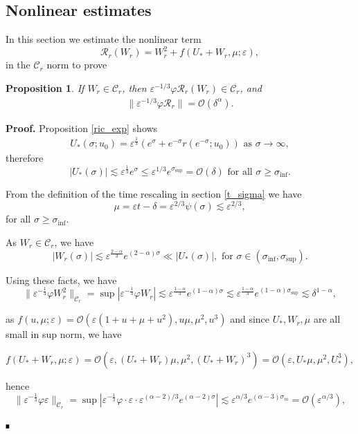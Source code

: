 \documentclass[letterpaper,11pt]{article}
\newcommand{\rmO}{\mathcal{O}}
\newcommand{\eps}{\varepsilon}
\newcommand{\lar}{ \lesssim }
\numberwithin{equation}{section}
\theoremstyle{plain}
\newtheorem{proposition}[theorem]{Proposition}
\newenvironment{Proof}[1][.]%
 {\begin{trivlist}\item[]\textbf{Proof#1 }}%
 {\hspace*{\fill}$\rule{0.3\baselineskip}{0.35\baselineskip}$\end{trivlist}}
\begin{document}
\subsection{Nonlinear estimates}

In this section we estimate the nonlinear term
\[
\mathcal{R}_r(W_r) = W_r^2 + f(U_*+W_r, \mu ; \eps),
\]
in the $\mathcal{C}_r$ norm to prove 
\begin{proposition}\label{nl_est_r}
If $W_r \in \mathcal{C}_{r}$, then $\eps^{-1/3}\varphi \mathcal{R}_r(W_r) \in \mathcal{C}_{r}$, and
\begin{align}
\|\eps^{-1/3}\varphi \mathcal{R}_r \| = \rmO(\delta^{\alpha}).
\end{align}
\end{proposition}
\begin{Proof} Proposition \ref{ric_exp} shows
\begin{align*}
U_*(\sigma;u_0) =  \eps^{\frac{1}{3}}(e^\sigma+e^{-\sigma} r(e^{-\sigma}; u_0)   ) \text{ as }\sigma \to \infty,
\end{align*}
therefore 
\[
|U_*(\sigma)| \lar \eps^{\frac{1}{3}}e^\sigma \le \eps^{1/3}e^{\sigma_{\sup}} = \rmO(\delta) \text{ for all } \sigma \ge \sigma_{\inf}.
\]

From the definition of the time rescaling in section \ref{t_sigma} we have
\[
\mu = \eps t-\delta  =\eps^{2/3}\psi(\sigma) \lar \eps^{2/3},
\]
for all $\sigma \ge \sigma_{\inf}$.

As $W_r \in \mathcal{C}_r$, we have 
\[
|W_r(\sigma)| \lar \eps^{\frac{2-\alpha}{3}} e^{(2-\alpha)\sigma} \ll |U_*(\sigma)|, \text{ for } \sigma \in (\sigma_{\inf}, \sigma_{\sup}).
\]

Using these facts, we have
\[
\|\eps^{-\frac{1}{3}}\varphi W_r^2\|_{\mathcal{C}_r}=\sup |\eps^{-\frac{1}{3}} \varphi W_r| \lar \eps^{\frac{1-\alpha}{3}} e^{(1-\alpha)\sigma} \lar \eps^{\frac{1-\alpha}{3}} e^{(1-\alpha)\sigma_{\sup}} \lar \delta^{1-\alpha},
\]

as $f(u,\mu; \eps) = \rmO(\eps(1+u+\mu+u^2),u\mu,\mu^2,u^3)$ and since $U_*,W_r,\mu$ are all small in sup norm, we have

\[
f(U_*+W_r, \mu ;\eps) = \rmO(\eps, (U_*+W_r)\mu, \mu^2, (U_*+W_r)^3 ) = \rmO(\eps, U_*\mu, \mu^2, U_*^3),
\]

hence
\[
\|\eps^{-\frac{1}{3}}\varphi \eps \|_{\mathcal{C}_r}=\sup |\eps^{-\frac{1}{3}} \varphi  \cdot \eps \cdot \eps^{(\alpha-2)/3}e^{(\alpha-2)\sigma}| \lar \eps^{\alpha/3} e^{(\alpha-3)\sigma_m} = \rmO(\eps^{\alpha/3}) ,
\]


\end{Proof}
\end{document}
